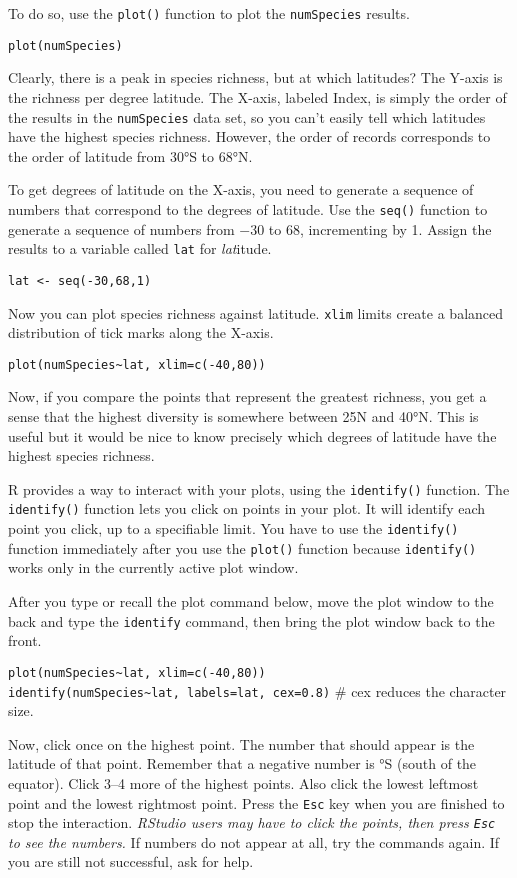 \documentclass[11pt]{article}
\begin{document}
To do so, use the \texttt{plot()} function to plot the
\texttt{numSpecies} results.

\texttt{plot(numSpecies)}

Clearly, there is a peak in species richness, but at which latitudes?
The Y-axis is the richness per degree latitude. The X-axis, labeled
Index, is simply the order of the results in the \texttt{numSpecies}
data set, so you can't easily tell which latitudes have the highest
species richness. However, the order of records corresponds to the order
of latitude from 30°S to 68°N.

To get degrees of latitude on the X-axis, you need to generate a
sequence of numbers that correspond to the degrees of latitude. Use the \texttt{seq()} function to generate a
sequence of numbers from $\minus$30 to 68, incrementing by 1. Assign the
results to a variable called \texttt{lat} for \emph{lat}itude.

\texttt{lat <- seq(-30,68,1)}

Now you can plot species richness against latitude. \texttt{xlim{}} limits create a balanced distribution of tick marks along the X-axis.

\texttt{plot(numSpecies\textasciitilde{}lat, xlim=c(-40,80))}

Now, if you compare the points that represent the greatest richness, you
get a sense that the highest diversity is somewhere between 25N and
40°N. This is useful but it would be nice to know precisely which
degrees of latitude have the highest species richness.

R provides a way to interact with your plots, using the
\texttt{identify()} function. The \texttt{identify()} function lets you
click on points in your plot. It will identify each point you click, up
to a specifiable limit. You have to use the \texttt{identify()} function
immediately after you use the \texttt{plot()} function because
\texttt{identify()} works only in the currently active plot window.

After you type or recall the plot command below, move the plot window to the back and type the \texttt{identify{}} command, then bring the plot window back to the front.

\texttt{plot(numSpecies\textasciitilde{}lat, xlim=c(-40,80))}\\
\texttt{identify(numSpecies\textasciitilde{}lat, labels=lat, cex=0.8)} \qquad \# cex reduces the character size.

Now, click once on the highest point. The number that should appear is the latitude of that point. Remember that a negative number is °S (south of the equator). Click 3–4 more of the highest points. Also click the lowest leftmost point and the
lowest rightmost point. Press the \texttt{Esc} key when you are finished
to stop the interaction. \emph{RStudio users may have to click the points, then press \texttt{Esc} to see
the numbers.} If numbers do not appear at all, try the commands again. If you are still not
successful, ask for help.
\end{document}
